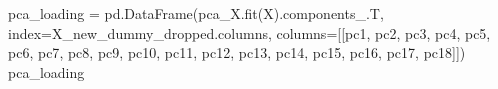 \documentclass[
  11pt,
  letterpaper,
  DIV=11,
  numbers=noendperiod]{scrartcl}
\newenvironment{Shaded}{\begin{snugshade}}{\end{snugshade}}
\newcommand{\NormalTok}[1]{\textcolor[rgb]{0.00,0.23,0.31}{#1}}
\newcommand{\OperatorTok}[1]{\textcolor[rgb]{0.37,0.37,0.37}{#1}}
\newcommand{\StringTok}[1]{\textcolor[rgb]{0.13,0.47,0.30}{#1}}
\begin{document}
\begin{Shaded}
\begin{Highlighting}[]
\NormalTok{pca\_loading }\OperatorTok{=}\NormalTok{ pd.DataFrame(pca\_X.fit(X).components\_.T, index}\OperatorTok{=}\NormalTok{X\_new\_dummy\_dropped.columns, columns}\OperatorTok{=}\NormalTok{[[}\StringTok{\textquotesingle{}pc1\textquotesingle{}}\NormalTok{, }\StringTok{\textquotesingle{}pc2\textquotesingle{}}\NormalTok{, }\StringTok{\textquotesingle{}pc3\textquotesingle{}}\NormalTok{, }\StringTok{\textquotesingle{}pc4\textquotesingle{}}\NormalTok{, }\StringTok{\textquotesingle{}pc5\textquotesingle{}}\NormalTok{, }\StringTok{\textquotesingle{}pc6\textquotesingle{}}\NormalTok{, }\StringTok{\textquotesingle{}pc7\textquotesingle{}}\NormalTok{, }\StringTok{\textquotesingle{}pc8\textquotesingle{}}\NormalTok{, }\StringTok{\textquotesingle{}pc9\textquotesingle{}}\NormalTok{, }\StringTok{\textquotesingle{}pc10\textquotesingle{}}\NormalTok{,}
            \StringTok{\textquotesingle{}pc11\textquotesingle{}}\NormalTok{, }\StringTok{\textquotesingle{}pc12\textquotesingle{}}\NormalTok{, }\StringTok{\textquotesingle{}pc13\textquotesingle{}}\NormalTok{, }\StringTok{\textquotesingle{}pc14\textquotesingle{}}\NormalTok{, }\StringTok{\textquotesingle{}pc15\textquotesingle{}}\NormalTok{, }\StringTok{\textquotesingle{}pc16\textquotesingle{}}\NormalTok{, }\StringTok{\textquotesingle{}pc17\textquotesingle{}}\NormalTok{, }\StringTok{\textquotesingle{}pc18\textquotesingle{}}\NormalTok{]])}
\NormalTok{pca\_loading}
\end{Highlighting}
\end{Shaded}
\end{document}
